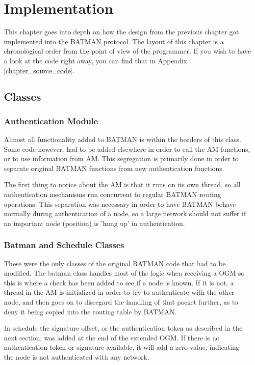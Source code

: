 \chapter{Implementation}\label{chapter_implementation}

This chapter goes into depth on how the design from the previous chapter got
implemented into the BATMAN protocol. The layout of this chapter is a
chronological order from the point of view of the programmer. If you wish to
have a look at the code right away, you can find that in Appendix
\ref{chapter_source_code}.


\section{Classes}

\subsection{Authentication Module}
Almost all functionality added to BATMAN is within the borders of this class.
Some code however, had to be added elsewhere in order to call the \ac{AM}
functions, or to use information from \ac{AM}. This segregation is primarily
done in order to separate original BATMAN functions from new authentication
functions.

The first thing to notice about the \ac{AM} is that it runs on its own thread,
so all authentication mechanisms run concurrent to regular BATMAN routing
operations. This separation was necessary in order to have BATMAN behave
normally during authentication of a node, so a large network should not suffer
if an important node (position) is 'hung up' in authentication.

\subsection{Batman and Schedule Classes}
These were the only classes of the original BATMAN code that had to be modified.
The batman class handles most of the logic when receiving a \ac{OGM} so this is
where a check has been added to see if a node is known. If it is not, a thread
in the \ac{AM} is initialized in order to try to authenticate with the other
node, and then goes on to disregard the handling of that packet further, as to
deny it being copied into the routing table by BATMAN.

In schedule the signature offset, or the authentication token as described in
the next section, was added at the end of the extended \ac{OGM}. If there is no
authentication token or signature available, it will add a zero value,
indicating the node is not authenticated with any network.

